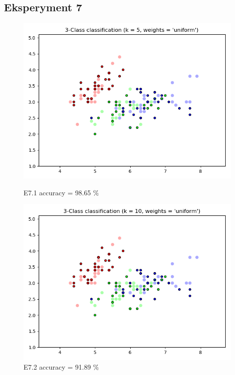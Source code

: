 \documentclass{classrep}
\begin{document}
	\subsection{Eksperyment 7}
		\begin{figure}[H]
			\begin{minipage}{0.5\linewidth}
				\centering
				\includegraphics[scale=0.25]{KNN_iris_7_1.png}
				\caption{E7.1 accuracy = 98.65 \%}
			\end{minipage}
			\begin{minipage}{0.5\linewidth}
				\centering
				\includegraphics[scale=0.25]{KNN_iris_7_2.png}
				\caption{E7.2 accuracy = 91.89 \%}
				\label{E7.2}
			\end{minipage}

\end{figure}
\end{document}
